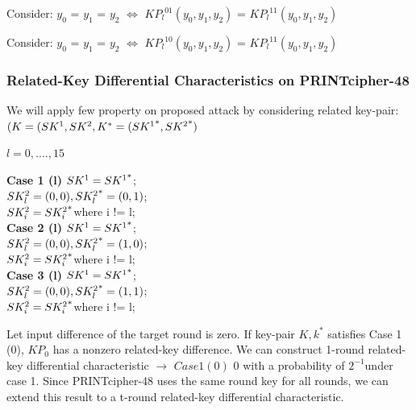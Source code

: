 \documentclass[journal=tosc,preprint]{iacrtrans}
\begin{document}
Consider: \({y_0}\) = \({y_1}\) = \({y_2}\) $\Leftrightarrow$ \({KP_l}^{01}\)\(({y_0},{y_1},{y_2})\) = \({KP_l}^{11}\)\(({y_0},{y_1},{y_2})\)

Consider: \({y_0}\) = \({y_1}\) = \({y_2}\) $\Leftrightarrow$ \({KP_l}^{10}\)\(({y_0},{y_1},{y_2})\) = \({KP_l}^{11}\)\(({y_0},{y_1},{y_2})\)

\subsubsection{Related-Key Differential Characteristics on PRINTcipher-48}

We will apply few property on proposed attack by considering related key-pair: \newline
\((K = (S{K^1},S{K^2}, {K^*} = (S{K^1\textsuperscript{*}},S{K^2\textsuperscript{*}})\)

\(l = 0,....,15\)

\begin{multicols}{3}
	\centering
\textbf{Case 1 (l)}
\(S{K^1}=S{K^1\textsuperscript{*}}\);\\
\(S{K_l^2}=(0,0), S{K_l^2\textsuperscript{*}}=(0,1)\);\\
\(S{K_i^2}=S{K_i^2\textsuperscript{*}}\)where i != l;\\

\textbf{Case 2 (l)}
\(S{K^1}=S{K^1\textsuperscript{*}}\);\\
\(S{K_l^2}=(0,0), S{K_l^2\textsuperscript{*}}=(1,0)\);\\
\(S{K_i^2}=S{K_i^2\textsuperscript{*}}\)where i != l;\\

\textbf{Case 3 (l)}
\(S{K^1}=S{K^1\textsuperscript{*}}\);\\
\(S{K_l^2}=(0,0), S{K_l^2\textsuperscript{*}}=(1,1)\);\\
\(S{K_i^2}=S{K_i^2\textsuperscript{*}}\)where i != l;\\
\end{multicols}


Let input difference of the target round is zero. If key-pair \(K, {k^*}\) satisfies Case 1 (0), \(K{P_0}\) has a nonzero related-key difference. We can construct 1-round related-key differential characteristic  $\rightarrow$ \(Case 1 (0)\) 0 with a probability of \(2^{-1}\)under case 1. Since PRINTcipher-48 uses the same round key for all rounds, we can extend this result to a t-round related-key differential characteristic.
\end{document}
